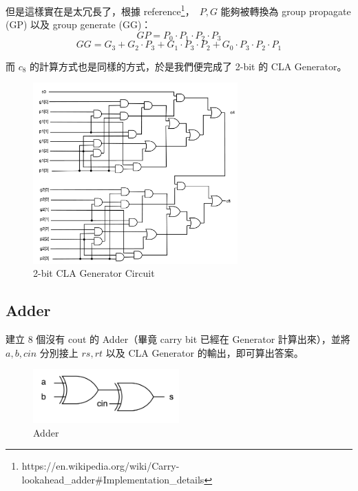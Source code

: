 \documentclass[10.5pt,compsoc,UTF8]{CjC}
\theoremstyle{mystyle}
\begin{document}
但是這樣實在是太冗長了，根據 reference\footnote{https://en.wikipedia.org/wiki/Carry-lookahead\_adder\#Implementation\_details}，\
$P, G$ 能夠被轉換為 group propagate (GP) 以及 group generate (GG)：
$$GP = P_0 \cdot P_1 \cdot P_2 \cdot P_3$$
$$GG = G_3 + G_2 \cdot P_3 + G_1 \cdot P_3 \cdot P_2 + G_0 \cdot P_3 \cdot P_2 \cdot P_1$$

而 $c_8$ 的計算方式也是同樣的方式，於是我們便完成了 2-bit 的 CLA Generator。

\begin{figure}[htp]
  \centering
  \includegraphics[width=0.7\textwidth]{2-bit-Gen.png}
  \caption{2-bit CLA Generator Circuit}
\end{figure}

\newpage

\subsection{Adder}

建立 $8$ 個沒有 cout 的 Adder（畢竟 carry bit 已經在 Generator 計算出來），並將 $a, b, cin$ 分別接上 $rs, rt$ 以及 CLA Generator 的輸出，即可算出答案。

\begin{figure}[htp]
  \centering
  \includegraphics[width=0.5\textwidth]{Adder.png}
  \caption{Adder}
\end{figure}
\end{document}
